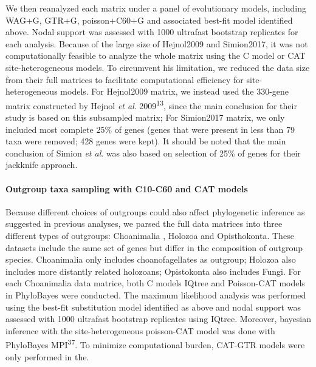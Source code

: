 \documentclass[]{article}
\let\oldparagraph\paragraph
\renewcommand{\paragraph}[1]{\oldparagraph{#1}\mbox{}}
\begin{document}
We then reanalyzed each matrix under a panel of evolutionary models,
including WAG+G, GTR+G, poisson+C60+G and associated best-fit model
identified above. Nodal support was assessed with 1000 ultrafast
bootstrap replicates for each analysis. Because of the large size of
Hejnol2009 and Simion2017, it was not computationally feasible to
analyze the whole matrix using the C model or CAT site-heterogeneous
models. To circumvent his limitation, we reduced the data size from
their full matrices to facilitate computational efficiency for
site-heterogeneous models. For Hejnol2009 matrix, we instead used the
330-gene matrix constructed by Hejnol \emph{et al}.
2009\textsuperscript{13}, since the main conclusion for their study is
based on this subsampled matrix; For Simion2017 matrix, we only included
most complete 25\% of genes (genes that were present in less than 79
taxa were removed; 428 genes were kept). It should be noted that the
main conclusion of Simion \emph{et al}. was also based on selection of
25\% of genes for their jackknife approach.

\hypertarget{outgroup-taxa-sampling-with-c10-c60-and-cat-models}{%
\paragraph{Outgroup taxa sampling with C10-C60 and CAT
models}\label{outgroup-taxa-sampling-with-c10-c60-and-cat-models}}

Because different choices of outgroups could also affect phylogenetic
inference as suggested in previous analyses, we parsed the full data
matrices into three different types of outgroups: Choanimalia , Holozoa
and Opisthokonta. These datasets include the same set of genes but
differ in the composition of outgroup species. Choanimalia only includes
choanofagellates as outgroup; Holozoa also includes more distantly
related holozoans; Opistokonta also includes Fungi. For each Choanimalia
data matrice, both C models IQtree and Poisson-CAT models in PhyloBayes
were conducted. The maximum likelihood analysis was performed using the
best-fit substitution model identified as above and nodal support was
assessed with 1000 ultrafast bootstrap replicates using IQtree.
Moreover, bayesian inference with the site-heterogeneous poisson-CAT
model was done with PhyloBayes MPI\textsuperscript{37}. To minimize
computational burden, CAT-GTR models were only performed in the.
\end{document}
